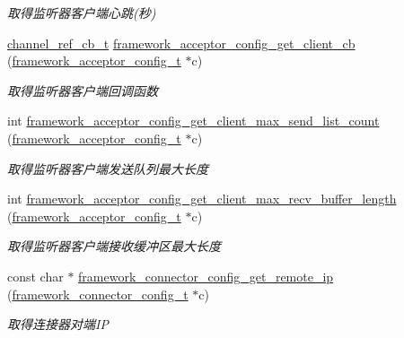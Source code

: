\begin{DoxyCompactItemize}
\begin{DoxyCompactList}\small\item\em 取得监听器客户端心跳(秒) \end{DoxyCompactList}\item 
\hyperlink{a00051_ae296ec4d1ce108960de8dcc423956a1d_ae296ec4d1ce108960de8dcc423956a1d}{channel\+\_\+ref\+\_\+cb\+\_\+t} \hyperlink{a00055_ac7701d809c6474d8e606d224b8f63259_ac7701d809c6474d8e606d224b8f63259}{framework\+\_\+acceptor\+\_\+config\+\_\+get\+\_\+client\+\_\+cb} (\hyperlink{a00051_a61a4e424ff4c86631423dedd97c40064_a61a4e424ff4c86631423dedd97c40064}{framework\+\_\+acceptor\+\_\+config\+\_\+t} $\ast$c)
\begin{DoxyCompactList}\small\item\em 取得监听器客户端回调函数 \end{DoxyCompactList}\item 
int \hyperlink{a00055_abbc66fe7a78fe5ecc57377558578fdb9_abbc66fe7a78fe5ecc57377558578fdb9}{framework\+\_\+acceptor\+\_\+config\+\_\+get\+\_\+client\+\_\+max\+\_\+send\+\_\+list\+\_\+count} (\hyperlink{a00051_a61a4e424ff4c86631423dedd97c40064_a61a4e424ff4c86631423dedd97c40064}{framework\+\_\+acceptor\+\_\+config\+\_\+t} $\ast$c)
\begin{DoxyCompactList}\small\item\em 取得监听器客户端发送队列最大长度 \end{DoxyCompactList}\item 
int \hyperlink{a00055_a57338d58973436dba20f7e264784302d_a57338d58973436dba20f7e264784302d}{framework\+\_\+acceptor\+\_\+config\+\_\+get\+\_\+client\+\_\+max\+\_\+recv\+\_\+buffer\+\_\+length} (\hyperlink{a00051_a61a4e424ff4c86631423dedd97c40064_a61a4e424ff4c86631423dedd97c40064}{framework\+\_\+acceptor\+\_\+config\+\_\+t} $\ast$c)
\begin{DoxyCompactList}\small\item\em 取得监听器客户端接收缓冲区最大长度 \end{DoxyCompactList}\item 
const char $\ast$ \hyperlink{a00055_a0fbfc87ecd9e3f9eb5e2b11cb41492c0_a0fbfc87ecd9e3f9eb5e2b11cb41492c0}{framework\+\_\+connector\+\_\+config\+\_\+get\+\_\+remote\+\_\+ip} (\hyperlink{a00051_a81253f4c995b97e69be0e67f7a26097f_a81253f4c995b97e69be0e67f7a26097f}{framework\+\_\+connector\+\_\+config\+\_\+t} $\ast$c)
\begin{DoxyCompactList}\small\item\em 取得连接器对端\+I\+P \end{DoxyCompactList}\item 

\end{DoxyCompactItemize}
